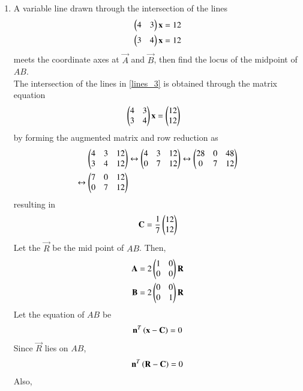 \begin{enumerate}[label=\arabic*.,ref=\thesubsection.\theenumi]

\item A variable line drawn through the 
intersection of the lines 
\begin{align} 
\label{lines_3}
\begin{pmatrix}4 & 3\end{pmatrix}\mathbf{x} &=12 
\\ 
\begin{pmatrix}3 & 4\end{pmatrix}\mathbf{x} &=12 
\end{align} 
meets the coordinate axes at $\vec{A}$ and $\vec{B}$, then find the locus of the midpoint of $AB$. 
\\
\solution The intersection of the lines in \eqref{lines_3} is obtained through the matrix equation 
\begin{align}
\begin{pmatrix}4 & 3 \\ 3 & 4\end{pmatrix}\mathbf{x}  &=\begin{pmatrix}12\\12\end{pmatrix}
\end{align}
by forming the augmented matrix and row reduction as  
\begin{align}
\begin{pmatrix}4 & 3 &12 \\ 3 & 4 &12\end{pmatrix} &\leftrightarrow \begin{pmatrix}4 & 3 &12 \\ 0 & 7 &12\end{pmatrix} \leftrightarrow \begin{pmatrix}28 & 0 & 48 \\ 0 & 7 &12\end{pmatrix}
\nonumber \\
\leftrightarrow \begin{pmatrix}7 & 0 & 12 \\ 0 & 7 &12\end{pmatrix}&
\end{align}
resulting in 
\begin{align}
\mathbf{C}=\frac{1}{7}\begin{pmatrix}12\\12\end{pmatrix}
\end{align}
%
Let the $\vec{R}$ be the mid point of $AB$. Then,
\begin{align}
\label{eq:lines_3_abr}
\mathbf{A} =2 \begin{pmatrix}1 & 0\\0 & 0\end{pmatrix}\mathbf{R} 
\\
\mathbf{B} =2 \begin{pmatrix}0 & 0\\0 & 1\end{pmatrix}\mathbf{R} 
\end{align}
%
Let the equation of $AB$ be 
\begin{align}
\mathbf{n}^T\left(\mathbf{x} - \mathbf{C}\right) = 0
\label{eq:lines_3_def}
\end{align}
Since $\vec{R}$ lies on $AB$, 
\begin{align}
\mathbf{n}^T\left(\mathbf{R} - \mathbf{C}\right) = 0
\label{eq:lines_3_rc}
\end{align}
Also, 
\begin{align}

\end{align}
\end{enumerate}
